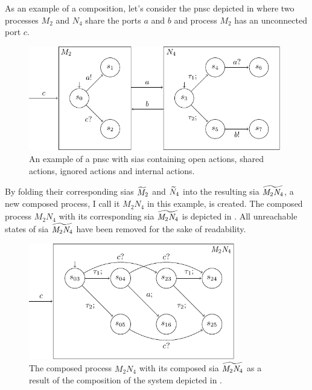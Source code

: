 As an example of a composition, let's consider the \gls{pnsc} depicted in \Fig{\ref{fig_sia_ex}} where two processes $M_2$ and $N_4$ share the ports $a$ and $b$ and process $M_2$ has an unconnected port $c$.
\begin{figure}[bht]
    \TopFigSpace
    \centering
    \includegraphics[width=11cm]{fig/sia_ex.pdf}
    \CaptionFigSpace
    \caption{An example of a \gls{pnsc} with \glspl{sia} containing open actions, shared actions, ignored actions and internal actions.}
    \label{fig_sia_ex}
    \BotFigSpace
\end{figure}
By folding their corresponding \glspl{sia} $\widetilde{M}_2$ and $\widetilde{N}_4$ into the resulting \gls{sia} $\widetilde{\mathit{M}_2\mathit{N}_4}$, a new composed process, I call it $\mathit{M}_2\mathit{N}_4$ in this example, is created.
The composed process $\mathit{M}_2\mathit{N}_4$ with its corresponding \gls{sia} $\widetilde{\mathit{M}_2\mathit{N}_4}$ is depicted in \Fig{\ref{fig_sia_ex_fold}}.
All unreachable states of \gls{sia} $\widetilde{\mathit{M}_2\mathit{N}_4}$ have been removed for the sake of readability.
\begin{figure}[bht]
    \TopFigSpace
    \centering
    \includegraphics[width=9cm]{fig/sia_ex_fold.pdf}
    \CaptionFigSpace
    \caption{The composed process $\mathit{M}_2\mathit{N}_4$ with its composed \gls{sia} $\widetilde{\mathit{M}_2\mathit{N}_4}$ as a result of the composition of the system depicted in \Fig{\ref{fig_sia_ex}}.}
    \label{fig_sia_ex_fold}
    \BotFigSpace
\end{figure}

